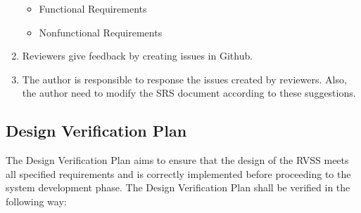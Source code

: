 \documentclass[12pt, titlepage]{article}
\begin{document}
\begin{enumerate}
\begin{itemize}
    \item Functional Requirements
    \item Nonfunctional Requirements



\end{itemize}
\item Reviewers give feedback by creating issues in Github. 

\item The author is responsible to response the issues created by reviewers. Also, the author need to modify the SRS document according to these suggestions. 

\end{enumerate}


\subsection{Design Verification Plan}
\label{design_verification_plan}
The Design Verification Plan aims to ensure that the design of the RVSS meets all specified requirements and is correctly implemented before proceeding to the system development phase. The Design Verification Plan shall be verified in the following way: 
\end{document}

